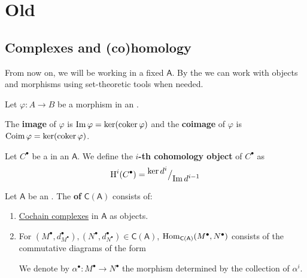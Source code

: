 \documentclass[../../main]{subfiles}
\begin{document}
\chapter{Old}
\section{Complexes and (co)homology}

From now on, we will be working in a fixed  \(\mathsf{A}\).
By the  we can work with objects and morphisms using set-theoretic tools when needed.
\begin{definition} \label{def:image}
  Let \(\varphi: A \to B\) be a morphism in an .

  The \textbf{image} of \(\varphi\) is \(\operatorname*{Im} \varphi = \ker(\operatorname*{coker} \varphi)\) and the \textbf{coimage} of \(\varphi\) is \(\operatorname*{Coim} \varphi = \ker(\operatorname*{coker} \varphi)\).
\end{definition}


\begin{definition}[Cohomology] \label{def:cohomology}
  Let \(C^{\bullet}\) be a  in an  \(\mathsf{A}\).
  We define the \textbf{\(i\)-th cohomology object} of \(C^{\bullet}\) as
  \begin{equation*}
    \operatorname{H}^{i}(C^{\bullet}) = {^{\textstyle \ker d^{i}}\big/_{\textstyle \operatorname*{Im} d^{i-1}}}
  \end{equation*}
\end{definition}

\begin{definition} \label{def:complex-category}
  Let \(\mathsf{A}\) be an .
  The \textbf{ of } \(\mathsf{C}(\mathsf{A})\) consists of:
  \begin{enumerate}
    \item \hyperref[def:complex]{Cochain complexes} in \(\mathsf{A}\) as objects.
    \item For \((M^{\bullet}, d_{M^{\bullet}}^{\bullet}), (N^{\bullet}, d_{N^{\bullet}}^{\bullet}) \in \mathsf{C}(\mathsf{A})\), \(\operatorname{Hom}_{\mathsf{C}(\mathsf{A})}(M^{\bullet}, N^{\bullet})\) consists of the commutative diagrams of the form
          \begin{center}
          \end{center}
          We denote by \(\alpha^{\bullet}: M^{\bullet} \to N^{\bullet}\) the morphism determined by the collection of \(\alpha^{i}\).
  \end{enumerate}
\end{definition}
\end{document}
